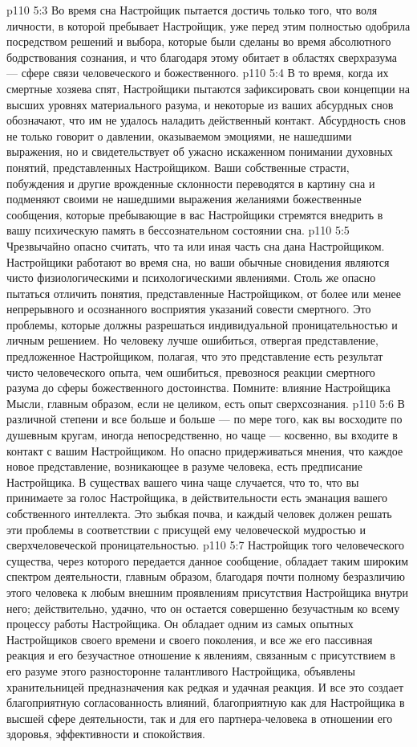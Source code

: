 \vs p110 5:3 Во время сна Настройщик пытается достичь только того, что воля личности, в которой пребывает Настройщик, уже перед этим полностью одобрила посредством решений и выбора, которые были сделаны во время абсолютного бодрствования сознания, и что благодаря этому обитает в областях сверхразума --- сфере связи человеческого и божественного.
\vs p110 5:4 В то время, когда их смертные хозяева спят, Настройщики пытаются зафиксировать свои концепции на высших уровнях материального разума, и некоторые из ваших абсурдных снов обозначают, что им не удалось наладить действенный контакт. Абсурдность снов не только говорит о давлении, оказываемом эмоциями, не нашедшими выражения, но и свидетельствует об ужасно искаженном понимании духовных понятий, представленных Настройщиком. Ваши собственные страсти, побуждения и другие врожденные склонности переводятся в картину сна и подменяют своими не нашедшими выражения желаниями божественные сообщения, которые пребывающие в вас Настройщики стремятся внедрить в вашу психическую память в бессознательном состоянии сна.
\vs p110 5:5 Чрезвычайно опасно считать, что та или иная часть сна дана Настройщиком. Настройщики работают во время сна, но ваши обычные сновидения являются чисто физиологическими и психологическими явлениями. Столь же опасно пытаться отличить понятия, представленные Настройщиком, от более или менее непрерывного и осознанного восприятия указаний совести смертного. Это проблемы, которые должны разрешаться индивидуальной проницательностью и личным решением. Но человеку лучше ошибиться, отвергая представление, предложенное Настройщиком, полагая, что это представление есть результат чисто человеческого опыта, чем ошибиться, превознося реакции смертного разума до сферы божественного достоинства. Помните: влияние Настройщика Мысли, главным образом, если не целиком, есть опыт сверхсознания.
\vs p110 5:6 В различной степени и все больше и больше --- по мере того, как вы восходите по душевным кругам, иногда непосредственно, но чаще --- косвенно, вы входите в контакт с вашим Настройщиком. Но опасно придерживаться мнения, что каждое новое представление, возникающее в разуме человека, есть предписание Настройщика. В существах вашего чина чаще случается, что то, что вы принимаете за голос Настройщика, в действительности есть эманация вашего собственного интеллекта. Это зыбкая почва, и каждый человек должен решать эти проблемы в соответствии с присущей ему человеческой мудростью и сверхчеловеческой проницательностью.
\vs p110 5:7 \pc Настройщик того человеческого существа, через которого передается данное сообщение, обладает таким широким спектром деятельности, главным образом, благодаря почти полному безразличию этого человека к любым внешним проявлениям присутствия Настройщика внутри него; действительно, удачно, что он остается совершенно безучастным ко всему процессу работы Настройщика. Он обладает одним из самых опытных Настройщиков своего времени и своего поколения, и все же его пассивная реакция и его безучастное отношение к явлениям, связанным с присутствием в его разуме этого разносторонне талантливого Настройщика, объявлены хранительницей предназначения как редкая и удачная реакция. И все это создает благоприятную согласованность влияний, благоприятную как для Настройщика в высшей сфере деятельности, так и для его партнера\hyp{}человека в отношении его здоровья, эффективности и спокойствия.
